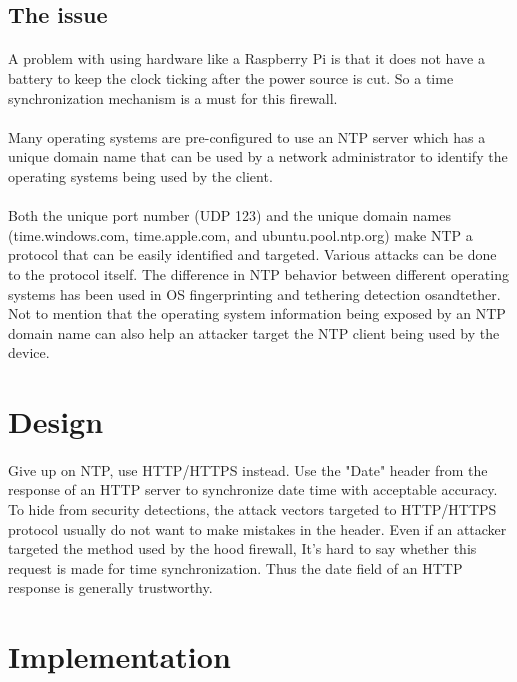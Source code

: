 \documentclass[mscthesis]{usiinfthesis}
\begin{document}
\subsection{The issue}
\paragraph{}
A problem with using hardware like a Raspberry Pi is that it does not have a battery to keep the clock ticking after the power source is cut. So a time synchronization mechanism is a must for this firewall.
\paragraph{}
Many operating systems are pre-configured to use an NTP server which has a unique domain name that can be used by a network administrator to identify the operating systems being used by the client.
\paragraph{}
Both the unique port number (UDP 123) and the unique domain names (time.windows.com, time.apple.com, and ubuntu.pool.ntp.org) make NTP a protocol that can be easily identified and targeted. Various attacks can be done to the protocol itself\citep{ntp:attack}. The difference in NTP behavior between different operating systems has been used in OS fingerprinting and tethering detection {osandtether}. Not to mention that the operating system information being exposed by an NTP domain name can also help an attacker target the NTP client being used by the device.

\section{Design}
\paragraph{}
Give up on NTP, use HTTP/HTTPS instead. Use the "Date" header from the response of an HTTP server to synchronize date time with acceptable accuracy. To hide from security detections, the attack vectors targeted to HTTP/HTTPS protocol usually do not want to make mistakes in the header. Even if an attacker targeted the method used by the hood firewall, It's hard to say whether this request is made for time synchronization. Thus the date field of an HTTP response is generally trustworthy.

\section{Implementation}
\end{document}
